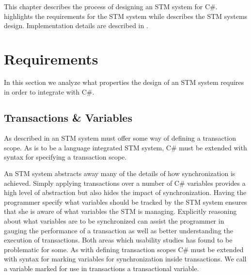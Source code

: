 \makeatletter {}\makeatother
{}
This chapter describes the process of designing an \ac{STM} system for C\#.  highlights the requirements for the \ac{STM} system while  describes the \ac{STM} systems design. Implementation details are described in .
\label{chap:stm_design}
\section{Requirements}
\label{sec:stm_requirements}
In this section we analyze what properties the design of an \ac{STM} system requires in order to integrate with C\#.
\subsection{Transactions \& Variables}
\label{subsec:rec_transactions_variables}
As described in  an \ac{STM} system must offer some way of defining a transaction scope. As \stmnamesp is to be a language integrated \ac{STM} system, C\# must be extended with syntax for specifying a transaction scope.

An \ac{STM} system abstracts away many of the details of how synchronization is achieved. Simply applying transactions over a number of C\# variables provides a high level of abstraction but also hides the impact of synchronization. Having the programmer specify what variables should be tracked by the \ac{STM} system ensures that she is aware of what variables the \ac{STM} is managing. Explicitly reasoning about what variables are to be synchronized can assist the programmer in gauging the performance of a transaction as well as better understanding the execution of transactions. Both areas which usability studies\cite{rossbach2010transactional}\cite{pankratius2009does} has found to be problematic for some. As with defining transaction scopes C\# must be extended with syntax for marking variables for synchronization inside transactions. We call a variable marked for use in transactions a transactional variable.

